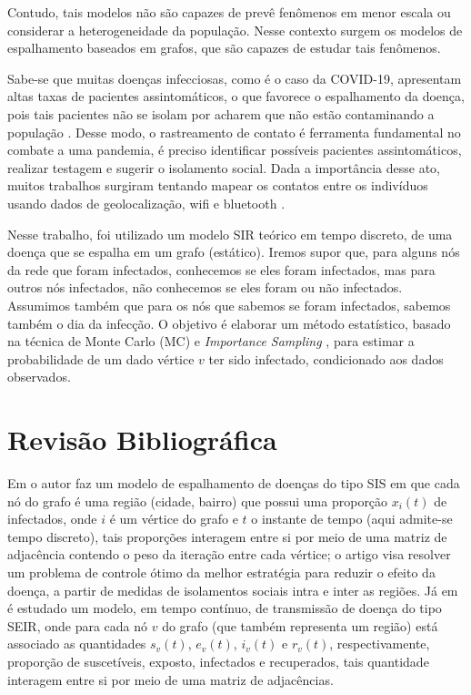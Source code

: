 \documentclass{article}
\begin{document}
Contudo, tais modelos não são capazes de prevê fenômenos em menor escala ou considerar a heterogeneidade da população. Nesse contexto surgem os modelos de espalhamento baseados em grafos, que são capazes de estudar tais fenômenos.

Sabe-se que muitas doenças infecciosas, como é o caso da COVID-19, apresentam altas taxas de pacientes assintomáticos, o que favorece o espalhamento da doença, pois tais pacientes não se isolam por acharem que não estão contaminando a população \cite{asymptomatic}. Desse modo, o rastreamento de contato é ferramenta fundamental no combate a uma pandemia, é preciso identificar possíveis pacientes assintomáticos, realizar testagem e sugerir o isolamento social. Dada a importância desse ato, muitos trabalhos surgiram tentando mapear os contatos entre os indivíduos usando dados de geolocalização, wifi e bluetooth \cite{ceara, tracing, tracing2}.

Nesse trabalho, foi utilizado um modelo SIR teórico em tempo discreto, de uma doença que se espalha em um grafo (estático). Iremos supor que, para alguns nós da rede que foram infectados, conhecemos se eles foram infectados, mas para outros nós infectados, não conhecemos se eles foram ou não infectados. Assumimos também que para os nós que sabemos se foram infectados, sabemos também o dia da infecção. O objetivo é elaborar um método estatístico, basado na técnica de Monte Carlo (MC) e \textit{Importance Sampling} \cite{ImportSample}, para estimar a probabilidade de um dado vértice $v$ ter sido infectado, condicionado aos dados observados.

\section{Revisão Bibliográfica}

Em \cite{SISCidadeControle} o autor faz um modelo de espalhamento de doenças do tipo SIS em que cada nó do grafo é uma região (cidade, bairro) que possui uma proporção $x_i(t)$ de infectados, onde $i$ é um vértice do grafo e $t$ o instante de tempo (aqui admite-se tempo discreto), tais proporções interagem entre si por meio de uma matriz de adjacência contendo o peso da iteração entre cada vértice; o artigo visa resolver um problema de controle ótimo da melhor estratégia para reduzir o efeito da doença, a partir de medidas de isolamentos sociais intra e inter as regiões. Já em \cite{SEIRgrafo} é estudado um modelo, em tempo contínuo, de transmissão de doença do tipo SEIR, onde para cada nó $v$ do grafo (que também representa um região) está associado as quantidades $s_v(t)$, $e_v(t)$, $i_v(t)$ e $r_v(t)$, respectivamente, proporção de suscetíveis, exposto, infectados e recuperados, tais quantidade interagem entre si por meio de uma matriz de adjacências.
\end{document}
